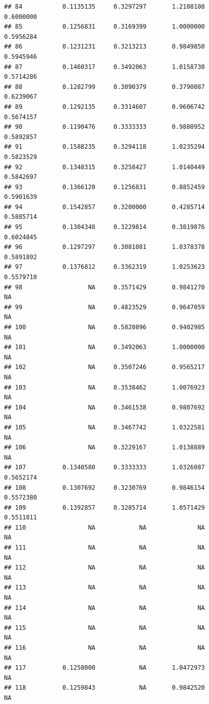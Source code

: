\documentclass[]{article}
\begin{document}
\begin{verbatim}
## 84           0.1135135     0.3297297       1.2108108          0.6000000
## 85           0.1256831     0.3169399       1.0000000          0.5956284
## 86           0.1231231     0.3213213       0.9849850          0.5945946
## 87           0.1460317     0.3492063       1.0158730          0.5714286
## 88           0.1282799     0.3090379       0.3790087          0.6239067
## 89           0.1292135     0.3314607       0.9606742          0.5674157
## 90           0.1190476     0.3333333       0.9880952          0.5892857
## 91           0.1588235     0.3294118       1.0235294          0.5823529
## 92           0.1348315     0.3258427       1.0140449          0.5842697
## 93           0.1366120     0.1256831       0.8852459          0.5901639
## 94           0.1542857     0.3200000       0.4285714          0.5885714
## 95           0.1304348     0.3229814       0.3819876          0.6024845
## 96           0.1297297     0.3081081       1.0378378          0.5891892
## 97           0.1376812     0.3362319       1.0253623          0.5579710
## 98                  NA     0.3571429       0.9841270                 NA
## 99                  NA     0.4823529       0.9647059                 NA
## 100                 NA     0.5820896       0.9402985                 NA
## 101                 NA     0.3492063       1.0000000                 NA
## 102                 NA     0.3507246       0.9565217                 NA
## 103                 NA     0.3538462       1.0076923                 NA
## 104                 NA     0.3461538       0.9807692                 NA
## 105                 NA     0.3467742       1.0322581                 NA
## 106                 NA     0.3229167       1.0138889                 NA
## 107          0.1340580     0.3333333       1.0326087          0.5652174
## 108          0.1307692     0.3230769       0.9846154          0.5572380
## 109          0.1392857     0.3285714       1.0571429          0.5511811
## 110                 NA            NA              NA                 NA
## 111                 NA            NA              NA                 NA
## 112                 NA            NA              NA                 NA
## 113                 NA            NA              NA                 NA
## 114                 NA            NA              NA                 NA
## 115                 NA            NA              NA                 NA
## 116                 NA            NA              NA                 NA
## 117          0.1250000            NA       1.0472973                 NA
## 118          0.1259843            NA       0.9842520                 NA

\end{verbatim}
\end{document}
